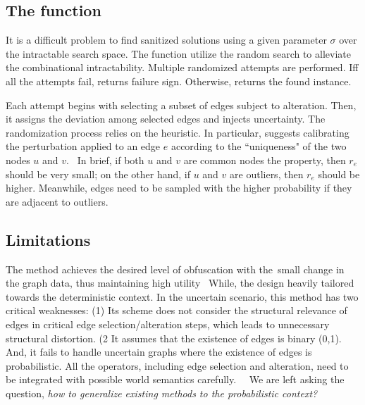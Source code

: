 \subsection{The function {\genobf}}
It is a difficult problem to find {\keobf} sanitized solutions using a given parameter $\sigma$ over the intractable search space. 
The function {\genobf} utilize the random search to alleviate the combinational intractability. 
Multiple randomized attempts are performed.
Iff all the attempts fail, {\genobf} returns failure sign. Otherwise, returns the found {\keobf} instance. 

Each attempt begins with selecting a subset of edges subject to alteration. 
Then, it assigns the deviation among selected edges and injects uncertainty. 
The randomization process relies on the heuristic.  
In particular, {\soaName} suggests calibrating the perturbation applied to an edge $e$ according to the ``uniqueness" of the two nodes $u$ and $v$. 
In brief, if both $u$ and $v$ are common nodes {\wrt} the property, then $r_{e}$ should be very small; 
on the other hand, if $u$ and $v$ are outliers, then $r_{e}$ should be higher. 
Meanwhile, edges need to be sampled with the higher probability if they are adjacent to outliers. 

\subsection{Limitations} 
The {\soaName} method achieves the desired level of obfuscation with the small change in the graph data, thus maintaining high utility 
While, the design heavily tailored towards the deterministic context. 
In the uncertain scenario, this method has two critical weaknesses: 
(1) Its scheme does not consider the structural relevance of edges in critical edge selection/alteration steps, which leads to unnecessary structural distortion. 
(2 It assumes that the existence of edges is binary (0,1). And, it fails to handle uncertain graphs where the existence of edges is probabilistic. 
All the operators, including edge selection and alteration, need to be integrated with possible world semantics carefully.  
We are left asking the question, \emph{how to generalize existing methods to the probabilistic context?}



